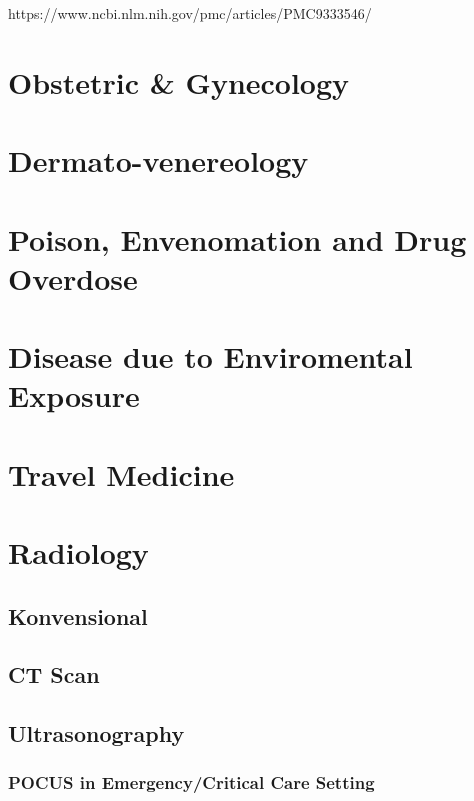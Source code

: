 \documentclass[
  letterpaper,
  DIV=11,
  numbers=noendperiod]{scrreprt}
\begin{document}
https://www.ncbi.nlm.nih.gov/pmc/articles/PMC9333546/

\chapter{Obstetric \& Gynecology}\label{obstetric-gynecology}

\chapter{Dermato-venereology}\label{dermato-venereology}

\chapter{Poison, Envenomation and Drug
Overdose}\label{poison-envenomation-and-drug-overdose}

\chapter{Disease due to Enviromental
Exposure}\label{disease-due-to-enviromental-exposure}

\chapter{Travel Medicine}\label{travel-medicine}

\chapter{Radiology}\label{radiology}

\section{Konvensional}\label{konvensional}

\section{CT Scan}\label{ct-scan}

\section{Ultrasonography}\label{ultrasonography}

\subsection{POCUS in Emergency/Critical Care
Setting}\label{pocus-in-emergencycritical-care-setting}
\end{document}
